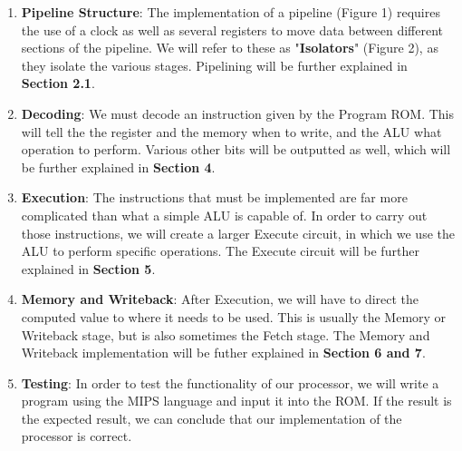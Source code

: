 \documentclass{article}
\begin{document}
\begin{enumerate}
\item
\textbf{Pipeline Structure}: The implementation of a pipeline (Figure 1) requires the use of a clock as well as several registers to move data between different sections of the pipeline. We will refer to these as "\textbf{Isolators}" (Figure 2), as they isolate the various stages. Pipelining will be further explained in \textbf{Section 2.1}.

\item
\textbf{Decoding}: We must decode an instruction given by the Program ROM. This will tell the the register and the memory when to write, and the ALU what operation to perform. Various other bits will be outputted as well, which will be further explained in \textbf{Section 4}.

\item
\textbf{Execution}: The instructions that must be implemented are far more complicated than what a simple ALU is capable of. In order to carry out those instructions, we will create a larger Execute circuit, in which we use the ALU to perform specific operations. The Execute circuit will be further explained in \textbf{Section 5}.

\item
\textbf{Memory and Writeback}: After Execution, we will have to direct the computed value to where it needs to be used. This is usually the Memory or Writeback stage, but is also sometimes the Fetch stage. The Memory and Writeback implementation will be futher explained in \textbf{Section 6 and 7}.

\item
\textbf{Testing}: In order to test the functionality of our processor, we will write a program using the MIPS language and input it into the ROM. If the result is the expected result, we can conclude that our implementation of the processor is correct.
\end{enumerate}
\end{document}
